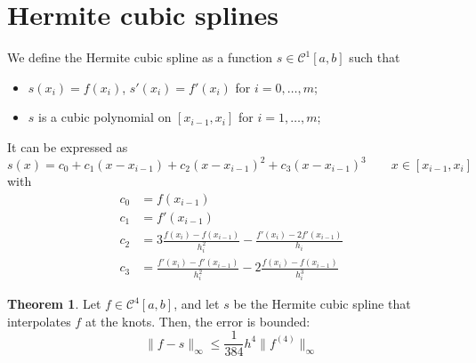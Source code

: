 \documentclass[12pt, openany]{report}
\theoremstyle{definition}
\newtheorem{thm}{Theorem}[chapter]
\begin{document}
\section{Hermite cubic splines}
We define the Hermite cubic spline as a function $s\in \mathcal{C}^1[a,b]$ such that 
\begin{itemize}
    \item $s(x_i) = f(x_i)$, $s'(x_i)=f'(x_i)$ for $i=0,\dots,m$;
    \item $s$ is a cubic polynomial on $[x_{i-1}, x_i]$ for $i=1,\dots,m$;
\end{itemize}
It can be expressed as 
\begin{equation}
    s(x) = c_0 + c_1(x-x_{i-1}) + c_2(x-x_{i-1})^2 + c_3(x-x_{i-1})^3 \qquad x\in [x_{i-1},x_i]
\end{equation}
with 
\begin{equation}
    \begin{aligned}
        c_0 &= f(x_{i-1})\\
        c_1 &= f'(x_{i-1})\\
        c_2 &= 3\frac{f(x_i)-f(x_{i-1})}{h_i^2} - \frac{f'(x_i)-2f'(x_{i-1})}{h_i}\\
        c_3 &= \frac{f'(x_i)-f'(x_{i-1})}{h_i^2} - 2\frac{f(x_i)-f(x_{i-1})}{h_i^3}
    \end{aligned}
\end{equation}
\begin{thm}
    Let $f\in \mathcal{C}^4[a,b]$, and let $s$ be the Hermite cubic spline that interpolates $f$ at the knots. Then, the error is bounded:
    \begin{equation}
        \lVert f-s\rVert_\infty \le \frac{1}{384}h^4 \lVert f^{(4)}\rVert_\infty
    \end{equation}
\end{thm}
\end{document}
